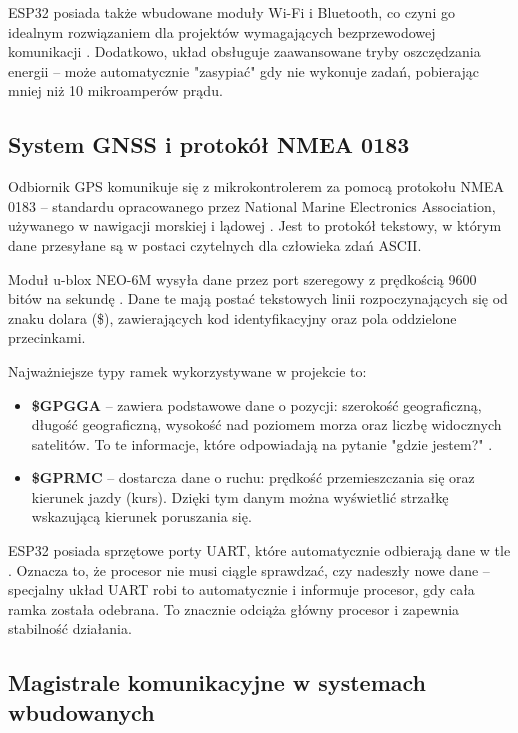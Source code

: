 \documentclass[12pt, a4paper]{EE-dyplom}
\begin{document}
ESP32 posiada także wbudowane moduły Wi-Fi i Bluetooth, co czyni go idealnym rozwiązaniem dla projektów wymagających bezprzewodowej komunikacji \cite{botland_esp32}. Dodatkowo, układ obsługuje zaawansowane tryby oszczędzania energii – może automatycznie "zasypiać" gdy nie wykonuje zadań, pobierając mniej niż 10 mikroamperów prądu.

\subsection{System GNSS i protokół NMEA 0183}

Odbiornik GPS komunikuje się z mikrokontrolerem za pomocą protokołu NMEA 0183 – standardu opracowanego przez National Marine Electronics Association, używanego w nawigacji morskiej i lądowej \cite{wikipedia_nmea, geoforum_nmea}. Jest to protokół tekstowy, w którym dane przesyłane są w postaci czytelnych dla człowieka zdań ASCII.

Moduł u-blox NEO-6M wysyła dane przez port szeregowy z prędkością 9600 bitów na sekundę \cite{ublox_datasheet}. Dane te mają postać tekstowych linii rozpoczynających się od znaku dolara (\$), zawierających kod identyfikacyjny oraz pola oddzielone przecinkami.

Najważniejsze typy ramek wykorzystywane w projekcie to:

\begin{itemize}
    \item \textbf{\$GPGGA} – zawiera podstawowe dane o pozycji: szerokość geograficzną, długość geograficzną, wysokość nad poziomem morza oraz liczbę widocznych satelitów. To te informacje, które odpowiadają na pytanie "gdzie jestem?" \cite{elektropraktyk_nmea}.
    \item \textbf{\$GPRMC} – dostarcza dane o ruchu: prędkość przemieszczania się oraz kierunek jazdy (kurs). Dzięki tym danym można wyświetlić strzałkę wskazującą kierunek poruszania się.
\end{itemize}

ESP32 posiada sprzętowe porty UART, które automatycznie odbierają dane w tle \cite{esp32_trm}. Oznacza to, że procesor nie musi ciągle sprawdzać, czy nadeszły nowe dane – specjalny układ UART robi to automatycznie i informuje procesor, gdy cała ramka została odebrana. To znacznie odciąża główny procesor i zapewnia stabilność działania.

\subsection{Magistrale komunikacyjne w systemach wbudowanych}
\end{document}
